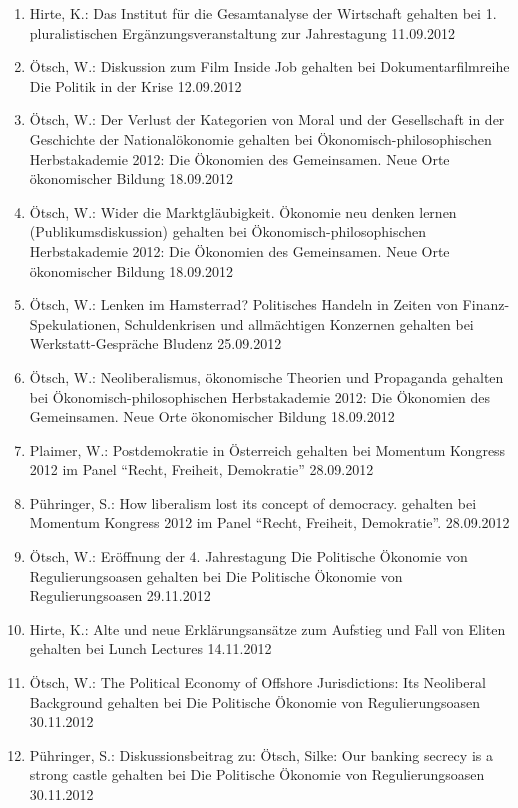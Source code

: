 \begin{enumerate}
	\item Hirte, K.: Das Institut für die Gesamtanalyse der Wirtschaft gehalten bei 1. pluralistischen Ergänzungsveranstaltung zur Jahrestagung 11.09.2012
	\item Ötsch, W.: Diskussion zum Film Inside Job gehalten bei Dokumentarfilmreihe Die Politik in der Krise 12.09.2012
	\item Ötsch, W.: Der Verlust der Kategorien von Moral und der Gesellschaft in der Geschichte der Nationalökonomie gehalten bei Ökonomisch-philosophischen Herbstakademie 2012: Die Ökonomien des Gemeinsamen. Neue Orte ökonomischer Bildung 18.09.2012
	\item Ötsch, W.: Wider die Marktgläubigkeit. Ökonomie neu denken lernen (Publikumsdiskussion) gehalten bei Ökonomisch-philosophischen Herbstakademie 2012: Die Ökonomien des Gemeinsamen. Neue Orte ökonomischer Bildung 18.09.2012
	\item Ötsch, W.: Lenken im Hamsterrad? Politisches Handeln in Zeiten von Finanz-Spekulationen, Schuldenkrisen und allmächtigen Konzernen gehalten bei Werkstatt-Gespräche Bludenz 25.09.2012
	\item Ötsch, W.: Neoliberalismus, ökonomische Theorien und Propaganda gehalten bei Ökonomisch-philosophischen Herbstakademie 2012: Die Ökonomien des Gemeinsamen. Neue Orte ökonomischer Bildung 18.09.2012
	\item Plaimer, W.: Postdemokratie in Österreich gehalten bei Momentum Kongress 2012 im Panel “Recht, Freiheit, Demokratie” 28.09.2012
	\item Pühringer, S.: How liberalism lost its concept of democracy. gehalten bei Momentum Kongress 2012 im Panel “Recht, Freiheit, Demokratie”. 28.09.2012
	\item Ötsch, W.: Eröffnung der 4. Jahrestagung Die Politische Ökonomie von Regulierungsoasen gehalten bei Die Politische Ökonomie von Regulierungsoasen 29.11.2012
	\item Hirte, K.: Alte und neue Erklärungsansätze zum Aufstieg und Fall von Eliten gehalten bei Lunch Lectures 14.11.2012
	\item Ötsch, W.: The Political Economy of Offshore Jurisdictions: Its Neoliberal Background gehalten bei Die Politische Ökonomie von Regulierungsoasen 30.11.2012
	\item Pühringer, S.: Diskussionsbeitrag zu: Ötsch, Silke: Our banking secrecy is a strong castle gehalten bei Die Politische Ökonomie von Regulierungsoasen 30.11.2012
\end{enumerate}
